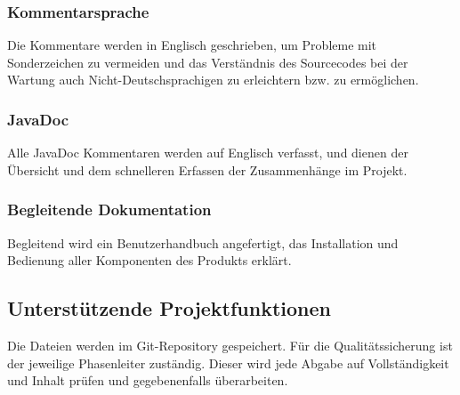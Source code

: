 \subsubsection{Kommentarsprache}
Die Kommentare werden in Englisch geschrieben, um Probleme mit Sonderzeichen zu vermeiden und das Verständnis des Sourcecodes bei der Wartung auch Nicht-Deutschsprachigen zu erleichtern bzw. zu ermöglichen.

\subsubsection{JavaDoc}
 Alle JavaDoc Kommentaren werden auf Englisch verfasst, und dienen der Übersicht und dem schnelleren Erfassen der Zusammenhänge im Projekt.

\subsubsection{Begleitende Dokumentation}
Begleitend wird ein Benutzerhandbuch angefertigt, das Installation und Bedienung aller Komponenten des Produkts erklärt.

\subsection{Unterstützende Projektfunktionen}
  
Die Dateien werden im Git-Repository gespeichert. Für die Qualitätssicherung ist der jeweilige Phasenleiter zuständig. Dieser wird jede Abgabe auf Vollständigkeit und Inhalt prüfen und gegebenenfalls überarbeiten.